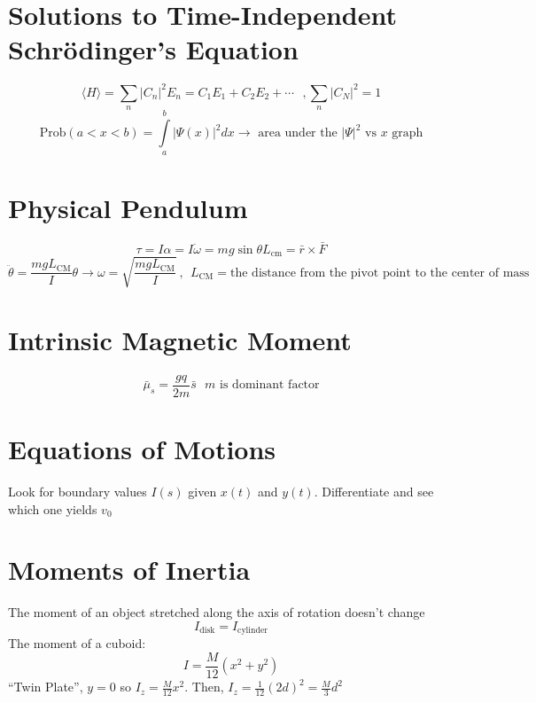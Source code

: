 \documentclass[10pt,letter]{article}
\begin{document}
\section{Solutions to Time-Independent Schr\"odinger's Equation} %
\label{sec:solutions_to_time_independent_schr}
\begin{equation}
    \langle H \rangle = \sum \limits_n |C_n|^2 E_n = C_1E_1 + C_2 E_2 + \cdots~~~ ,\sum \limits_n |C_N|^2 = 1
\end{equation}
\begin{equation}
    \textrm{Prob}(a<x<b) = \int \limits_a^b |\Psi(x)|^2dx \rightarrow \textrm{ area under the } |\Psi|^2 \textrm{ vs }x \textrm{ graph}
\end{equation}

\section{Physical Pendulum} %
\label{sec:physical_pendulum}
\begin{equation}
    \tau = I \alpha = I \dot{\omega} = mg\sin \theta L_{\textrm{cm}} = \bar{r} \times \bar{F}
\end{equation}
\begin{equation}
    \ddot{\theta} = \frac{mgL_{\textrm{CM}}}{I}\theta \rightarrow \omega = \sqrt{\frac{mgL_{\textrm{CM}}}{I}}~,~~ L_{\textrm{CM}}= \textrm{the distance from the pivot point to the center of mass}
\end{equation}

\section{Intrinsic Magnetic Moment} %
\label{sec:intrinsic_magnetic_moment}
\begin{equation}
    \bar{\mu}_s = \frac{gq}{2m}\bar{s}~~~m \textrm{ is dominant factor}
\end{equation}

\section{Equations of Motions} %
\label{sec:equations_of_motions}
Look for boundary values $I(s)$ given $x(t)$ and $y(t)$. Differentiate and see which one yields $v_0$

\section{Moments of Inertia} %
\label{sec:moments_of_inertia}
The moment of an object stretched along the axis of rotation doesn't change
\begin{equation}
    I_{\textrm{disk}} = I_{\textrm{cylinder}}
\end{equation}
The moment of a cuboid: 
\begin{equation}
    I = \frac{M}{12}(x^2 + y^2)
\end{equation}
``Twin Plate'', $y=0$ so $I_z = \frac{M}{12}x^2$. Then, $I_z = \frac{1}{12}(2d)^2 = \frac{M}{3}d^2$
\end{document}
